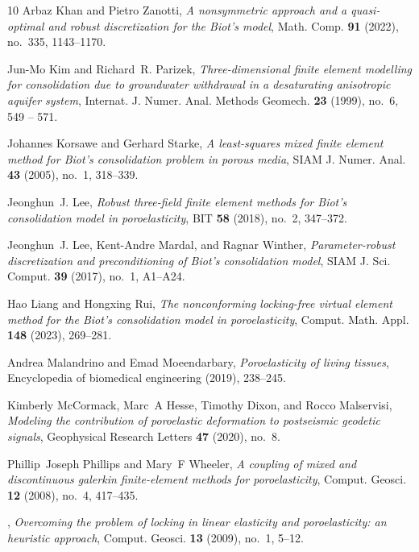 \documentclass{amsart}
\begin{document}
\begin{thebibliography}{10}
Arbaz Khan and Pietro Zanotti, \emph{A nonsymmetric approach and a
  quasi-optimal and robust discretization for the {B}iot's model}, Math. Comp.
  \textbf{91} (2022), no.~335, 1143--1170. 

Jun-Mo Kim and Richard~R. Parizek, \emph{Three-dimensional finite element
  modelling for consolidation due to groundwater withdrawal in a desaturating
  anisotropic aquifer system}, Internat. J. Numer. Anal. Methods Geomech.
  \textbf{23} (1999), no.~6, 549 – 571.

Johannes Korsawe and Gerhard Starke, \emph{A least-squares mixed finite element
  method for {B}iot's consolidation problem in porous media}, SIAM J. Numer.
  Anal. \textbf{43} (2005), no.~1, 318--339. 

Jeonghun~J. Lee, \emph{Robust three-field finite element methods for {B}iot's
  consolidation model in poroelasticity}, BIT \textbf{58} (2018), no.~2,
  347--372. 

Jeonghun~J. Lee, Kent-Andre Mardal, and Ragnar Winther, \emph{Parameter-robust
  discretization and preconditioning of {B}iot's consolidation model}, SIAM J.
  Sci. Comput. \textbf{39} (2017), no.~1, A1--A24. 

Hao Liang and Hongxing Rui, \emph{The nonconforming locking-free virtual
  element method for the {B}iot's consolidation model in poroelasticity},
  Comput. Math. Appl. \textbf{148} (2023), 269--281. 

Andrea Malandrino and Emad Moeendarbary, \emph{Poroelasticity of living
  tissues}, Encyclopedia of biomedical engineering (2019), 238--245.

Kimberly McCormack, Marc~A Hesse, Timothy Dixon, and Rocco Malservisi,
  \emph{Modeling the contribution of poroelastic deformation to postseismic
  geodetic signals}, Geophysical Research Letters \textbf{47} (2020), no.~8.

Phillip~Joseph Phillips and Mary~F Wheeler, \emph{A coupling of mixed and
  discontinuous galerkin finite-element methods for poroelasticity}, Comput.
  Geosci. \textbf{12} (2008), no.~4, 417--435.

\bysame, \emph{Overcoming the problem of locking in linear elasticity and
  poroelasticity: an heuristic approach}, Comput. Geosci. \textbf{13} (2009),
  no.~1, 5--12.


\end{thebibliography}
\end{document}
